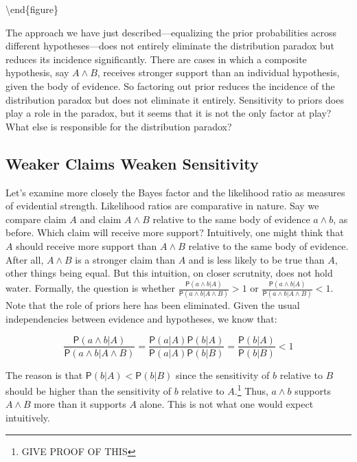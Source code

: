 \documentclass[10pt,dvipsnames,enabledeprecatedfontcommands]{scrartcl}
\newcommand{\pr}[1]{\mathsf{P}(#1)}
\begin{document}
\label{fig:bf-indiv-joint} \textbackslash{}end\{figure\}

The approach we have just described---equalizing the prior probabilities
across different hypotheses---does not entirely eliminate the
distribution paradox but reduces its incidence significantly. There are
cases in which a composite hypothesis, say \(A \wedge B\), receives
stronger support than an individual hypothesis, given the body of
evidence. So factoring out prior reduces the incidence of the
distribution paradox but does not eliminate it entirely. Sensitivity to
priors does play a role in the paradox, but it seems that it is not the
only factor at play? What else is responsible for the distribution
paradox?

\hypertarget{weaker-claims-weaken-sensitivity}{%
\subsection{Weaker Claims Weaken
Sensitivity}\label{weaker-claims-weaken-sensitivity}}

Let's examine more closely the Bayes factor and the likelihood ratio as
measures of evidential strength. Likelihood ratios are comparative in
nature. Say we compare claim \(A\) and claim \(A\wedge B\) relative to
the same body of evidence \(a\wedge b\), as before. Which claim will
receive more support? Intuitively, one might think that \(A\) should
receive more support than \(A\wedge B\) relative to the same body of
evidence. After all, \(A\wedge B\) is a stronger claim than \(A\) and is
less likely to be true than \(A\), other things being equal. But this
intuition, on closer scrutnity, does not hold water. Formally, the
question is whether
\(\frac{\pr{a\wedge b \vert A}}{\pr{a\wedge b \vert A \wedge B}}>1\) or
\(\frac{\pr{a\wedge b \vert A}}{\pr{a\wedge b \vert A \wedge B}}<1\).
Note that the role of priors here has been eliminated. Given the usual
independencies between evidence and hypotheses, we know that:

\[\frac{\pr{a\wedge b \vert A}}{\pr{a\wedge b \vert A \wedge B}}=\frac{\pr{a \vert A} \pr{b \vert A}}{\pr{a \vert A} \pr{b \vert B}}=\frac{\pr{b \vert A}}{\pr{b \vert B}}<1\]

\noindent The reason is that \(\pr{b \vert A} < \pr{b \vert B}\) since
the sensitivity of \(b\) relative to \(B\) should be higher than the
sensitivity of \(b\) relative to \(A\).\footnote{GIVE PROOF OF THIS}
Thus, \(a\wedge b\) supports \(A\wedge B\) more than it supports \(A\)
alone. This is not what one would expect intuitively.
\end{document}
